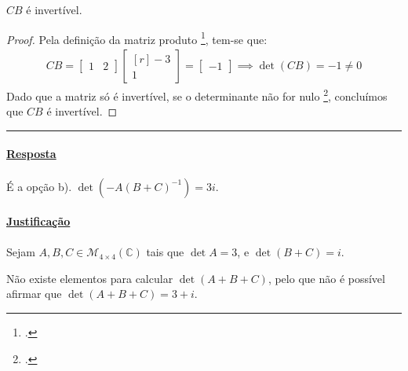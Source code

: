 \clearpage
\begin{proposition}[opção 1.d]\label{prop:i-1-d}
	$CB$ é invertível.
\end{proposition}

\begin{proof}
	Pela definição da matriz produto
	\footcite[pág. 12, Definição 1.18: matriz produto]{Cabral2012},
	tem-se que:
	\begin{align*}
		CB =
		\begin{bmatrix*}
			1 & 2
		\end{bmatrix*}
		\begin{bmatrix*}[r]
			-3\\
			1
		\end{bmatrix*}
		=
		\begin{bmatrix}
			-1
		\end{bmatrix} \implies \det (CB) = -1 \neq 0
	\end{align*}
	Dado que a matriz só é invertível, se o determinante não for nulo
	\footcite[pág. 144, Proposição 3.23]{Cabral2012}, concluímos que
	$CB$ é invertível.
\end{proof}

\vspace{0.5cm}
\hrule
\vspace{0.5cm}


\exercicio{}

\paragraph{\underline{Resposta}}

\paragraph{} É a opção b). $\det(-A(B + C)^{-1}) = 3i$.


\paragraph{\underline{Justificação}}


\paragraph{}Sejam $A, B, C \in \mathcal{M}_{4 \times 4}(\mathbb{C})$ tais que
$\det A = 3$, e $\det(B + C) = i$.

\begin{proposition}\label{prop:i-2-a}
	Não existe elementos para calcular $\det(A + B + C)$, pelo que não é
	possível afirmar que $\det(A + B + C) = 3 + i$.
\end{proposition}

